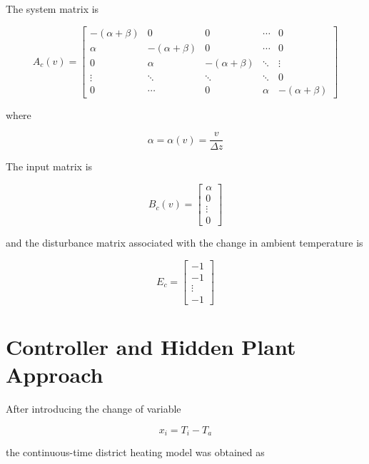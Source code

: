 The system matrix is

\begin{equation}
A_c(v)
=
\begin{bmatrix}
-(\alpha+\beta) & 0 & 0 & \cdots & 0 \\
\alpha & -(\alpha+\beta) & 0 & \cdots & 0 \\
0 & \alpha & -(\alpha+\beta) & \ddots & \vdots \\
\vdots & \ddots & \ddots & \ddots & 0 \\
0 & \cdots & 0 & \alpha & -(\alpha+\beta)
\end{bmatrix}
\end{equation}

where

\begin{equation}
    \alpha=\alpha(v)=\frac{v}{\Delta z}
\end{equation}

The input matrix is

\begin{equation}
B_c(v)
=
\begin{bmatrix}
\alpha \\
0 \\
\vdots \\
0
\end{bmatrix}
\end{equation}

and the disturbance matrix associated with the change in ambient temperature
is

\begin{equation}
E_c
=
\begin{bmatrix}
-1 \\
-1 \\
\vdots \\
-1
\end{bmatrix}
\end{equation}

\section{Controller and Hidden Plant Approach}
\label{sec:controller_hidden_plant}

After introducing the change of variable

\begin{equation}
    x_i = T_i-T_a
\end{equation}

the continuous-time district heating model was obtained as

